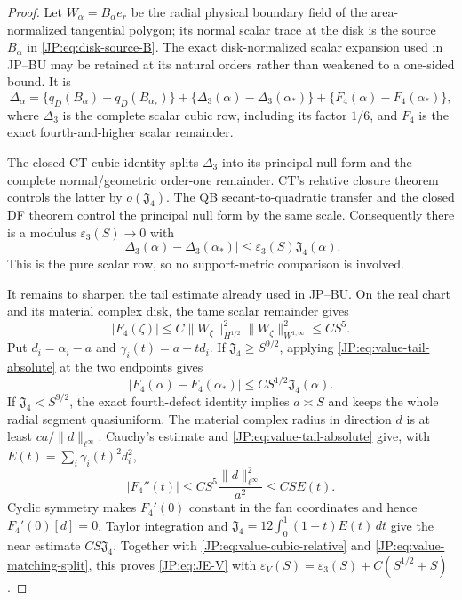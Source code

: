 \documentclass[11pt]{amsart}
\numberwithin{equation}{section}
\theoremstyle{definition}
\theoremstyle{remark}
\newcommand{\Jfour}{\mathfrak J_4}
\begin{document}
\begin{proof}
Let $W_\alpha=B_\alpha e_r$ be the radial physical boundary field of the
area-normalized tangential polygon; its normal scalar trace at the disk is
the source $B_\alpha$ in \eqref{JP:eq:disk-source-B}.  The exact
disk-normalized scalar expansion used in JP--BU may be retained
at its natural orders rather than weakened to a one-sided bound.  It is
\begin{equation}\label{JP:eq:value-matching-split}
 \Delta_\alpha
 =\{q_D(B_\alpha)-q_D(B_{\alpha_*})\}
  +\{\Delta_3(\alpha)-\Delta_3(\alpha_*)\}
  +\{F_4(\alpha)-F_4(\alpha_*)\},
\end{equation}
where $\Delta_3$ is the complete scalar cubic row, including its factor
$1/6$, and $F_4$ is the exact fourth-and-higher scalar remainder.

The closed CT cubic identity splits $\Delta_3$ into its principal null form
and the complete normal/geometric order-one remainder.  CT's relative
closure theorem controls the latter by $o(\Jfour)$.  The QB
secant-to-quadratic transfer and the closed DF theorem control the principal
null form by the same scale.  Consequently there is a modulus
$\varepsilon_3(S)\to0$ with
\begin{equation}\label{JP:eq:value-cubic-relative}
 |\Delta_3(\alpha)-\Delta_3(\alpha_*)|
 \le\varepsilon_3(S)\Jfour(\alpha).
\end{equation}
This is the pure scalar row, so no support-metric comparison is involved.

It remains to sharpen the tail estimate already used in JP--BU.  On the
real chart and its material complex disk, the tame scalar remainder gives
\begin{equation}\label{JP:eq:value-tail-absolute}
 |F_4(\zeta)|
 \le C\|W_\zeta\|_{H^{1/2}}^2
       \|W_\zeta\|_{W^{1,\infty}}^2
 \le CS^5.
\end{equation}
Put $d_i=\alpha_i-a$ and $\gamma_i(t)=a+td_i$.  If
$\Jfour\ge S^{9/2}$, applying \eqref{JP:eq:value-tail-absolute} at the two
endpoints gives
\[
 |F_4(\alpha)-F_4(\alpha_*)|
 \le CS^{1/2}\Jfour(\alpha).
\]
If $\Jfour<S^{9/2}$, the exact fourth-defect identity implies
$a\asymp S$ and keeps the whole radial segment quasiuniform.  The material
complex radius in direction $d$ is at least
$ca/\|d\|_{\ell^\infty}$.  Cauchy's estimate and
\eqref{JP:eq:value-tail-absolute} give, with
$E(t)=\sum_i\gamma_i(t)^2d_i^2$,
\[
 |F_4''(t)|
 \le CS^5\frac{\|d\|_{\ell^\infty}^2}{a^2}
 \le CS E(t).
\]
Cyclic symmetry makes $F_4'(0)$ constant in the fan coordinates and hence
$F_4'(0)[d]=0$.  Taylor integration and
$\Jfour=12\int_0^1(1-t)E(t)\,dt$ give the near estimate
$CS\Jfour$.  Together with \eqref{JP:eq:value-cubic-relative} and
\eqref{JP:eq:value-matching-split}, this proves \eqref{JP:eq:JE-V} with
$\varepsilon_V(S)=\varepsilon_3(S)+C(S^{1/2}+S)$.
\end{proof}
\end{document}

